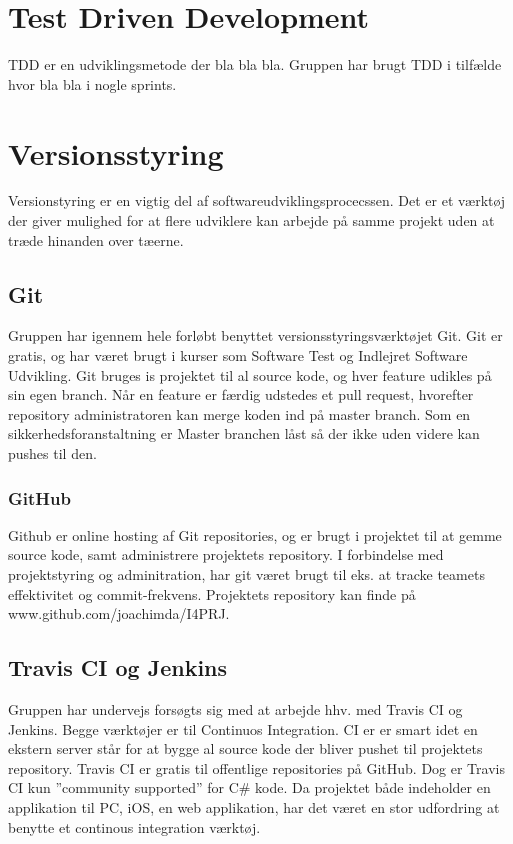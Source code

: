 \section{Test Driven Development}
TDD er en udviklingsmetode der bla bla bla. Gruppen har brugt TDD i tilfælde hvor bla bla i nogle sprints.

\section{Versionsstyring}
Versionstyring er en vigtig del af softwareudviklingsprocecssen. Det er et værktøj der giver mulighed for at flere udviklere kan arbejde på samme projekt uden at træde hinanden over tæerne.

\subsection{Git}
Gruppen har igennem hele forløbt benyttet versionsstyringsværktøjet Git. Git er gratis, og har været brugt i kurser som Software Test og Indlejret Software Udvikling. Git bruges is projektet til al source kode, og hver feature udikles på sin egen branch. Når en feature er færdig udstedes et pull request, hvorefter repository administratoren kan merge koden ind på master branch. Som en sikkerhedsforanstaltning er Master branchen låst så der ikke uden videre kan pushes til den.

\subsubsection{GitHub}
Github er online hosting af Git repositories, og er brugt i projektet til at gemme source kode, samt administrere projektets repository. I forbindelse med projektstyring og adminitration, har git været brugt til eks. at tracke teamets effektivitet og commit-frekvens.
Projektets repository kan finde på www.github.com/joachimda/I4PRJ.

\subsection{Travis CI og Jenkins}
Gruppen har undervejs forsøgts sig med at arbejde hhv. med Travis CI og Jenkins. Begge værktøjer er til Continuos Integration. CI er er smart idet en ekstern server står for at bygge al source kode der bliver pushet til projektets repository.  Travis CI er gratis til offentlige repositories på GitHub. Dog er Travis CI kun ”community supported” for C\# kode.
Da projektet både indeholder en applikation til PC, iOS, en web applikation, har det været en stor udfordring at benytte et continous integration værktøj.


